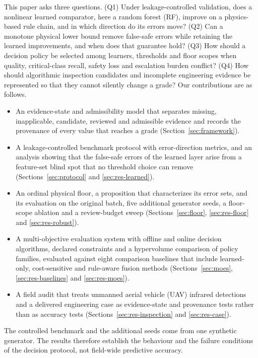 \documentclass[journal]{IEEEtran}
\begin{document}
This paper asks three questions. (Q1) Under leakage-controlled validation, does a nonlinear learned comparator, here a random forest (RF), improve on a physics-based rule chain, and in which direction do its errors move? (Q2) Can a monotone physical lower bound remove false-safe errors while retaining the learned improvements, and when does that guarantee hold? (Q3) How should a decision policy be selected among learners, thresholds and floor scopes when quality, critical-class recall, safety loss and escalation burden conflict? (Q4) How should algorithmic inspection candidates and incomplete engineering evidence be represented so that they cannot silently change a grade? Our contributions are as follows.
\begin{itemize}
\item An evidence-state and admissibility model that separates missing, inapplicable, candidate, reviewed and admissible evidence and records the provenance of every value that reaches a grade (Section~\ref{sec:framework}).
\item A leakage-controlled benchmark protocol with error-direction metrics, and an analysis showing that the false-safe errors of the learned layer arise from a feature-set blind spot that no threshold choice can remove (Sections~\ref{sec:protocol} and \ref{sec:res-learned}).
\item An ordinal physical floor, a proposition that characterizes its error sets, and its evaluation on the original batch, five additional generator seeds, a floor-scope ablation and a review-budget sweep (Sections~\ref{sec:floor}, \ref{sec:res-floor} and \ref{sec:res-robust}).
\item A multi-objective evaluation system with offline and online decision algorithms, declared constraints and a hypervolume comparison of policy families, evaluated against eight comparison baselines that include learned-only, cost-sensitive and rule-aware fusion methods (Sections~\ref{sec:moes}, \ref{sec:res-baselines} and \ref{sec:res-moes}).
\item A field audit that treats unmanned aerial vehicle (UAV) infrared detections and a delivered engineering case as evidence-state and provenance tests rather than as accuracy tests (Sections~\ref{sec:res-inspection} and \ref{sec:res-case}).
\end{itemize}
The controlled benchmark and the additional seeds come from one synthetic generator. The results therefore establish the behaviour and the failure conditions of the decision protocol, not field-wide predictive accuracy.
\end{document}

